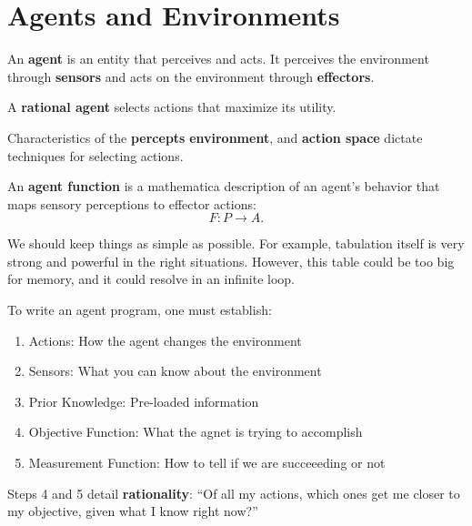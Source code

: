 
\section{Agents and Environments}

\begin{definition}
	An \textbf{agent} is an entity that perceives and acts. It perceives the environment through \textbf{sensors} and acts on the environment through \textbf{effectors}.
\end{definition}

\begin{definition}
	A \textbf{rational agent} selects actions that maximize its utility.
\end{definition}

\begin{definition}
	Characteristics of the \textbf{percepts} \textbf{environment}, and \textbf{action space} dictate techniques for selecting actions.
\end{definition}

\begin{definition}
	An \textbf{agent function} is a mathematica description of an agent's behavior that maps sensory perceptions to effector actions: \[
		F : P \to A
	.\] 
\end{definition}

We should keep things as simple as possible. For example, tabulation itself is very strong and powerful in the right situations. However, this table could be too big for memory, and it could resolve in an infinite loop.

To write an agent program, one must establish:
\begin{enumerate}
	\item Actions: How the agent changes the environment
	\item Sensors: What you can know about the environment
	\item Prior Knowledge: Pre-loaded information
	\item Objective Function: What the agnet is trying to accomplish
	\item Measurement Function: How to tell if we are succeeeding or not
\end{enumerate}

\begin{definition}
	Steps 4 and 5 detail \textbf{rationality}: ``Of all my actions, which ones get me closer to my objective, given what I know right now?''
\end{definition}

